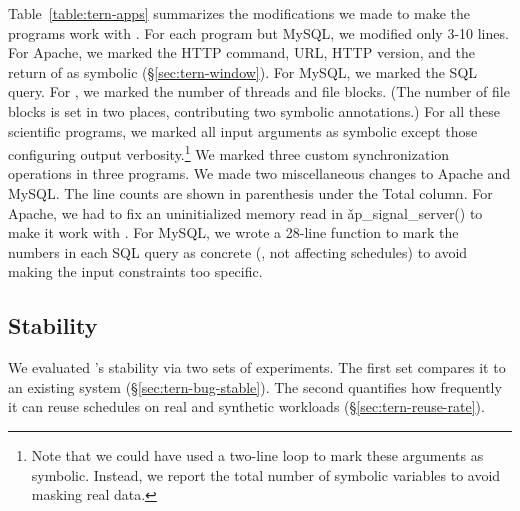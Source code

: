 Table~\ref{table:tern-apps} summarizes the modifications we made to make the
programs work with \tern.  For each program but MySQL, we modified only 3-10
lines.  For Apache, we marked the HTTP command, URL, HTTP version, and the
return of  as symbolic (\S\ref{sec:tern-window}).  For MySQL,
we marked the SQL query.  For \pbzip, we marked the number of threads and
file blocks.  (The number of file blocks is set in two places,
contributing two symbolic annotations.)  For all these scientific programs, we
marked all input arguments as symbolic except those configuring output
verbosity.\footnote{Note that we could have used a two-line loop to mark
  these arguments as symbolic.  Instead, we report the total number of
  symbolic variables to avoid masking real data.}  We marked three custom
synchronization operations in three \splash programs.  We made two
miscellaneous changes to Apache and MySQL.  The line counts are shown in
parenthesis under the Total column.  For Apache, we had to fix an
uninitialized memory read in \v{ap\_signal\_server()} to make it work with
\klee.  For MySQL, we wrote a 28-line function to mark the numbers in each
SQL query as concrete (\ie, not affecting schedules) to avoid making the
input constraints too specific.



\subsection{Stability} \label{sec:tern-stability}

We evaluated \tern's stability via two sets of experiments.  The first set
compares it to an existing \dmt system (\S\ref{sec:tern-bug-stable}). The
second quantifies how frequently it can reuse schedules on real and
synthetic workloads (\S\ref{sec:tern-reuse-rate}).


